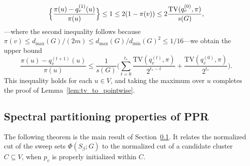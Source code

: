 	\begin{equation*}
	\Bigl\{\frac{\pi(u) - q_v^{(1)}(u)}{\pi(u)}\Bigr\} \leq 1 \leq 2(1 - \pi(v)) \leq 2\frac{\mathrm{TV}(q_v^{(0)},\pi)}{s(G)},
	\end{equation*}
	---where the second inequality follows because $\pi(v) \leq d_{\max}(G)/(2m) \leq d_{\max}(G)/d_{\min}(G)^2 \leq 1/16$---we obtain the upper bound
	\begin{equation*}
	\frac{\pi(u) - q_v^{(t + 1)}(u)}{\pi(u)} \leq \frac{1}{s(G)} \biggl(\sum_{t = 0}^{t_{\ast}} \frac{\mathrm{TV}(q_v^{(t)}, \pi)}{2^{t_{\ast} - t}} + \frac{\mathrm{TV}(q_v^{(0)}, \pi)}{2^{t_{\ast}}}\biggr).
	\end{equation*}
	This inequality holds for each $u \in V$, and taking the maximum over $u$ completes the proof of Lemma~\ref{lem:tv_to_pointwise}.

\subsection{Spectral partitioning properties of PPR}
\label{subsec:ppr_spectral_partitioning}
The following theorem is the main result of Section~\ref{subsec:ppr_spectral_partitioning}. It relates the normalized cut of the sweep sets $\Phi(S_{\beta};G)$ to the normalized cut of a candidate cluster $C \subseteq V$, when $p_v$ is properly initialized within $C$.

